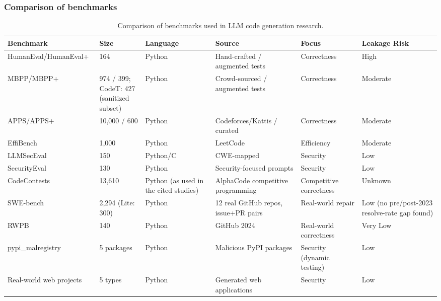 \documentclass[10pt,a4paper]{article}
\begin{document}
\subsubsection{Comparison of benchmarks}
\begin{table}[p]
\centering
\caption{Comparison of benchmarks used in LLM code generation research.}
\label{tab:cmp_benchmarks}
\footnotesize
\setlength{\tabcolsep}{3pt}
\renewcommand{\arraystretch}{1.08}
\begin{tabularx}{\textwidth}{@{}p{92pt}p{55pt}p{70pt}p{105pt}X p{62pt}@{}}
\toprule
\textbf{Benchmark} & \textbf{Size} & \textbf{Language} & \textbf{Source} & \textbf{Focus} & \textbf{Leakage Risk} \\
\midrule
HumanEval/HumanEval+~\cite{chen2021humaneval,chenbei2023} & 164 & Python & Hand-crafted / augmented tests & Correctness & High \\
MBPP/MBPP+~\cite{austin2021mbpp,chenbei2023} & \makecell{974 / 399;\\CodeT: 427\\(sanitized subset)} & Python & Crowd-sourced / augmented tests & Correctness & Moderate \\
APPS/APPS+~\cite{hendrycks2021apps,chenbei2023} & 10{,}000 / 600 & Python & Codeforces/Kattis / curated & Correctness & Moderate \\
EffiBench~\cite{huang2024effibench} & 1{,}000 & Python & LeetCode & Efficiency & Moderate \\
LLMSecEval~\cite{bruni2025} & 150 & Python/C & CWE-mapped & Security & Low \\
SecurityEval & 130 & Python & Security-focused prompts & Security & Low \\
CodeContests~\cite{lyu2025toppass,chenbei2023} & 13{,}610 & Python (as used in the cited studies) & AlphaCode competitive programming & Competitive correctness & Unknown \\
SWE-bench~\cite{jimenez2024swebench} & 2{,}294 (Lite: 300) & Python & 12 real GitHub repos, issue+PR pairs & Real-world repair & Low (no pre/post-2023 resolve-rate gap found) \\
RWPB~\cite{dou2026} & 140 & Python & GitHub 2024 & Real-world correctness & Very Low \\
pypi\_malregistry~\cite{liu2025llm4tdg} & 5 packages & Python & Malicious PyPI packages & Security (dynamic testing) & Low \\
Real-world web projects~\cite{ding2025codingcare} & 5 types & Python & Generated web applications & Security & Low \\

\end{tabularx}
\end{table}
\end{document}
